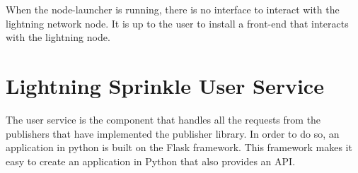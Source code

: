 When the node-launcher is running, there is no interface to interact with the lightning network node. It is up to the user to install a front-end that interacts with the lightning node. 



\section{Lightning Sprinkle User Service}

The user service is the component that handles all the requests from the publishers that have implemented the publisher library. In order to do so, an application in python is built on the Flask framework. This framework makes it easy to create an application in Python that also provides an API.

